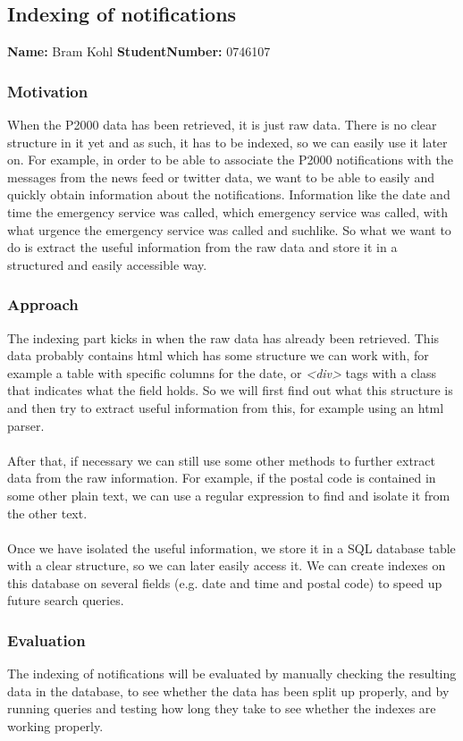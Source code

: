 \subsection{Indexing of notifications}
\textbf{Name:} Bram Kohl \indent \textbf{StudentNumber:} 0746107

\subsubsection*{Motivation}
When the P2000 data has been retrieved, it is just raw data. There is no clear structure in it yet and as such, it has to be indexed, so we can easily use it later on. For example, in order to be able to associate the P2000 notifications with the messages from the news feed or twitter data, we want to be able to easily and quickly obtain information about the notifications. Information like the date and time the emergency service was called, which emergency service was called, with what urgence the emergency service was called and suchlike. So what we want to do is extract the useful information from the raw data and store it in a structured and easily accessible way.
\subsubsection*{Approach}
The indexing part kicks in when the raw data has already been retrieved. This data probably contains html which has some structure we can work with,  for example a table with specific columns for the date, or \textit{\textless div\textgreater} tags with a class that indicates what the field holds. So we will first find out what this structure is and then try to extract useful information from this, for example using an html parser.\\\\
After that, if necessary we can still use some other methods to further extract data from the raw information. For example, if the postal code is contained in some other plain text, we can use a regular expression to find and isolate it from the other text.\\\\
Once we have isolated the useful information, we store it in a SQL database table with a clear structure, so we can later easily access it. We can create indexes on this database on several fields (e.g. date and time and postal code) to speed up future search queries.
\subsubsection*{Evaluation}
The indexing of notifications will be evaluated by manually checking the resulting data in the database, to see whether the data has been split up properly, and by running queries and testing how long they take to see whether the indexes are working properly.